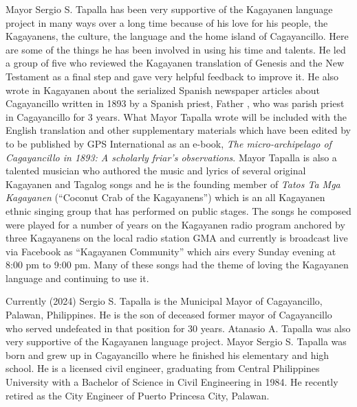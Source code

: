 Mayor Sergio S. Tapalla has been very supportive of the Kagayanen language project in many ways over a long time because of his love for his people, the Kagayanens, the culture, the language and the home island of Cagayancillo. Here are some of the things he has been involved in using his time and talents. He led a group of five who reviewed the Kagayanen translation of Genesis and the New Testament as a final step and gave very helpful feedback to improve it. He also wrote in Kagayanen about the serialized Spanish newspaper articles about Cagayancillo written in 1893 by a Spanish priest, Father , who was parish priest in Cagayancillo for 3 years. What Mayor Tapalla wrote will be included with the English translation and other supplementary materials which have been edited by  to be published by GPS International as an e-book, \textit{The micro-archipelago of Cagayancillo in 1893: A scholarly friar's observations}. Mayor Tapalla is also a talented musician who authored the music and lyrics of several original Kagayanen and Tagalog songs and he is the founding member of \textit{Tatos Ta Mga Kagayanen} (“Coconut Crab of the Kagayanens”) which is an all Kagayanen ethnic singing group that has performed on public stages. The songs he composed were played for a number of years on the Kagayanen radio program anchored by three Kagayanens on the local radio station GMA and currently is broadcast live via Facebook as “Kagayanen Community” which airs every Sunday evening at 8:00 pm to 9:00 pm. Many of these songs had the theme of loving the Kagayanen language and continuing to use it.

Currently (2024) Sergio S. Tapalla is the Municipal Mayor of Cagayancillo, Palawan, Philippines. He is the son of deceased former mayor of Cagayancillo  who served undefeated in that position for 30 years. Atanasio A. Tapalla was also very supportive of the Kagayanen language project. Mayor Sergio S. Tapalla was born and grew up in Cagayancillo where he finished his elementary and high school. He is a licensed civil engineer, graduating from Central Philippines University with a Bachelor of Science in Civil Engineering in 1984. He recently retired as the City Engineer of Puerto Princesa City, Palawan. 
